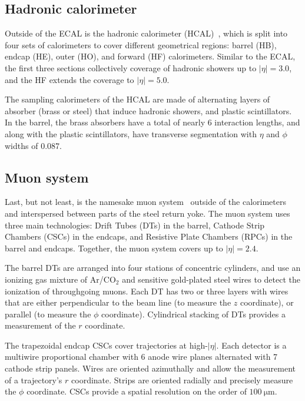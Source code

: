 \subsection{Hadronic calorimeter}

Outside of the ECAL is the hadronic calorimeter (HCAL)~\cite{CMS:PTDR2},
which is split into four sets of calorimeters to cover different geometrical
regions: barrel (HB), endcap (HE), outer (HO), and forward (HF) calorimeters.
Similar to the ECAL, the first three sections collectively coverage of hadronic showers 
up to $|\eta|=3.0$, and the HF extends the coverage to $|\eta|=5.0$.

The sampling calorimeters of the HCAL are made of alternating layers of
absorber (brass or steel) that induce hadronic showers, and plastic
scintillators. In the barrel, the brass absorbers have a total of nearly 6
interaction lengths, and along with the plastic scintillators, have
transverse segmentation with $\eta$ and $\phi$ widths of 0.087.

\subsection{Muon system}

Last, but not least, is the namesake muon system~\cite{CMS:Sirunyan2018fpa} outside of the calorimeters
and interspersed between parts of the steel return yoke. The muon system
uses three main technologies: Drift Tubes (DTs) in the barrel, Cathode
Strip Chambers (CSCs) in the endcaps, and Resistive Plate Chambers (RPCs)
in the barrel and endcaps. Together, the muon system covers up to $|\eta|=2.4$.

The barrel DTs are arranged into four stations of concentric cylinders,
and use an ionizing gas mixture of Ar/CO${}_2$ and sensitive gold-plated steel wires
to detect the ionization of throughgoing muons. Each DT has two or three layers
with wires that are either perpendicular to the beam line (to measure the $z$ coordinate),
or parallel (to measure the $\phi$ coordinate). Cylindrical stacking of
DTs provides a measurement of the $r$ coordinate.

The trapezoidal endcap CSCs cover trajectories at high-$|\eta|$. Each
detector is a multiwire proportional chamber with 6 anode wire planes alternated
with 7 cathode strip panels. Wires are oriented azimuthally and allow the measurement
of a trajectory's $r$ coordinate. Strips are oriented radially and precisely measure
the $\phi$ coordinate. CSCs provide a spatial resolution on the order of $100~\mathrm{\mu m}$.

